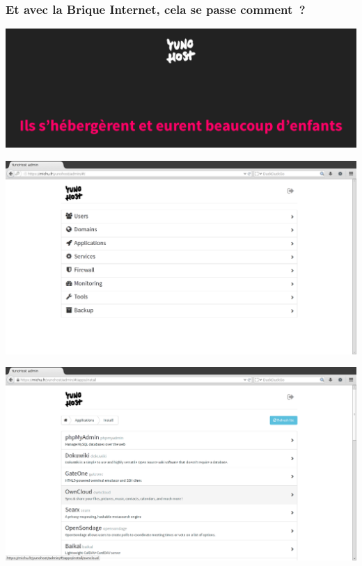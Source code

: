 \documentclass[notes=hide]{beamer}
\begin{document}
\begin{frame}[t]
\frametitle{\textcolor{titre}{Et avec la Brique Internet, cela se passe comment~?}}
\pause

\begin{center}
\includegraphics[width=\textwidth]{img2/yunohost_rien.png}
\end{center}
\end{frame}

\begin{frame}[t]
\begin{center}
\vfill
\includegraphics[width=\textwidth]{img2/17a-capture-yunohost.png}
\vfill
\end{center}
\end{frame}

\begin{frame}[t]
\begin{center}
\vfill
\includegraphics[width=\textwidth]{img2/19-capture-yunohostapps.png}
\vfill
\end{center}
\end{frame}
\end{document}
